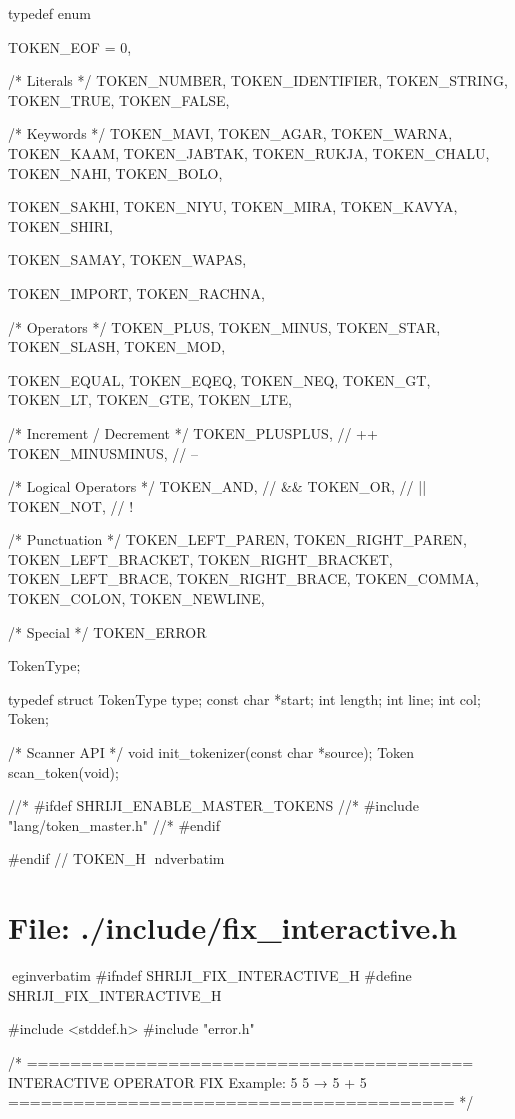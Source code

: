 \documentclass{article}
\begin{document}
typedef enum {

    TOKEN_EOF = 0,

    /* Literals */
    TOKEN_NUMBER,
    TOKEN_IDENTIFIER,
    TOKEN_STRING,
    TOKEN_TRUE,
    TOKEN_FALSE,

    /* Keywords */
    TOKEN_MAVI,
    TOKEN_AGAR,
    TOKEN_WARNA,
    TOKEN_KAAM,
    TOKEN_JABTAK,
    TOKEN_RUKJA,
    TOKEN_CHALU,
    TOKEN_NAHI,
    TOKEN_BOLO,

    TOKEN_SAKHI,
    TOKEN_NIYU,
    TOKEN_MIRA,
    TOKEN_KAVYA,
    TOKEN_SHIRI,

    TOKEN_SAMAY,
    TOKEN_WAPAS,

    TOKEN_IMPORT,
    TOKEN_RACHNA,

    /* Operators */
    TOKEN_PLUS,
    TOKEN_MINUS,
    TOKEN_STAR,
    TOKEN_SLASH,
    TOKEN_MOD,

    TOKEN_EQUAL,
    TOKEN_EQEQ,
    TOKEN_NEQ,
    TOKEN_GT,
    TOKEN_LT,
    TOKEN_GTE,
    TOKEN_LTE,

/* Increment / Decrement */
TOKEN_PLUSPLUS,     // ++
TOKEN_MINUSMINUS,   // --

/* Logical Operators */
TOKEN_AND,          // &&
TOKEN_OR,           // ||
TOKEN_NOT,          // !

    /* Punctuation */
    TOKEN_LEFT_PAREN,
    TOKEN_RIGHT_PAREN,
    TOKEN_LEFT_BRACKET,
    TOKEN_RIGHT_BRACKET,
    TOKEN_LEFT_BRACE,
    TOKEN_RIGHT_BRACE,
    TOKEN_COMMA,
    TOKEN_COLON,
    TOKEN_NEWLINE,

    /* Special */
    TOKEN_ERROR

} TokenType;

typedef struct {
    TokenType type;
    const char *start;
    int length;
    int line;
    int col;
} Token;

/* Scanner API */
void init_tokenizer(const char *source);
Token scan_token(void);

//* #ifdef SHRIJI_ENABLE_MASTER_TOKENS
//* #include "lang/token_master.h"
//* #endif

#endif // TOKEN_H
nd{verbatim}
\section*{File: ./include/fix_interactive.h}
egin{verbatim}
#ifndef SHRIJI_FIX_INTERACTIVE_H
#define SHRIJI_FIX_INTERACTIVE_H

#include <stddef.h>
#include "error.h"


/* =========================================
   INTERACTIVE OPERATOR FIX
   Example: 5 5 → 5 + 5
   ========================================= */
\end{document}
